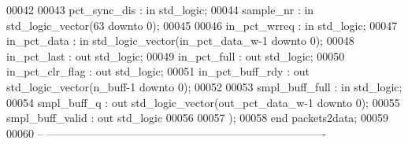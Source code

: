 \begin{DoxyCode}
00042       
00043       \textcolor{vhdlchar}{pct_sync_dis}      \textcolor{vhdlchar}{:} \textcolor{keywordflow}{in} \textcolor{comment}{std\_logic};
00044       \textcolor{vhdlchar}{sample_nr}         \textcolor{vhdlchar}{:} \textcolor{keywordflow}{in} \textcolor{comment}{std\_logic\_vector}\textcolor{vhdlchar}{(}\textcolor{vhdllogic}{}\textcolor{vhdllogic}{63} \textcolor{keywordflow}{downto} \textcolor{vhdllogic}{}\textcolor{vhdllogic}{0}\textcolor{vhdlchar}{)};
00045 
00046       \textcolor{vhdlchar}{in_pct_wrreq}      \textcolor{vhdlchar}{:} \textcolor{keywordflow}{in} \textcolor{comment}{std\_logic};
00047       \textcolor{vhdlchar}{in_pct_data}       \textcolor{vhdlchar}{:} \textcolor{keywordflow}{in} \textcolor{comment}{std\_logic\_vector}\textcolor{vhdlchar}{(}\textcolor{vhdlchar}{in_pct_data_w}\textcolor{vhdlchar}{-}\textcolor{vhdllogic}{}\textcolor{vhdllogic}{1} \textcolor{keywordflow}{downto} \textcolor{vhdllogic}{}\textcolor{vhdllogic}{0}\textcolor{vhdlchar}{)};
00048       \textcolor{vhdlchar}{in_pct_last}       \textcolor{vhdlchar}{:} \textcolor{keywordflow}{out} \textcolor{comment}{std\_logic};
00049       \textcolor{vhdlchar}{in_pct_full}       \textcolor{vhdlchar}{:} \textcolor{keywordflow}{out} \textcolor{comment}{std\_logic};
00050       \textcolor{vhdlchar}{in_pct_clr_flag}   \textcolor{vhdlchar}{:} \textcolor{keywordflow}{out} \textcolor{comment}{std\_logic};
00051       \textcolor{vhdlchar}{in_pct_buff_rdy}   \textcolor{vhdlchar}{:} \textcolor{keywordflow}{out} \textcolor{comment}{std\_logic\_vector}\textcolor{vhdlchar}{(}\textcolor{vhdlchar}{n_buff}\textcolor{vhdlchar}{-}\textcolor{vhdllogic}{}\textcolor{vhdllogic}{1} \textcolor{keywordflow}{downto} \textcolor{vhdllogic}{}\textcolor{vhdllogic}{0}\textcolor{vhdlchar}{)};
00052       
00053       \textcolor{vhdlchar}{smpl_buff_full}    \textcolor{vhdlchar}{:} \textcolor{keywordflow}{in} \textcolor{comment}{std\_logic};
00054       \textcolor{vhdlchar}{smpl_buff_q}       \textcolor{vhdlchar}{:} \textcolor{keywordflow}{out} \textcolor{comment}{std\_logic\_vector}\textcolor{vhdlchar}{(}\textcolor{vhdlchar}{out_pct_data_w}\textcolor{vhdlchar}{-}\textcolor{vhdllogic}{}\textcolor{vhdllogic}{1} \textcolor{keywordflow}{downto} \textcolor{vhdllogic}{}\textcolor{vhdllogic}{0}\textcolor{vhdlchar}{)};
00055       \textcolor{vhdlchar}{smpl_buff_valid}   \textcolor{vhdlchar}{:} \textcolor{keywordflow}{out} \textcolor{comment}{std\_logic}
00056       
00057         \textcolor{vhdlchar}{)};
00058 \textcolor{keywordflow}{end} \textcolor{vhdlchar}{packets2data};
00059 
00060 \textcolor{keyword}{-- ----------------------------------------------------------------------------}

\end{DoxyCode}
